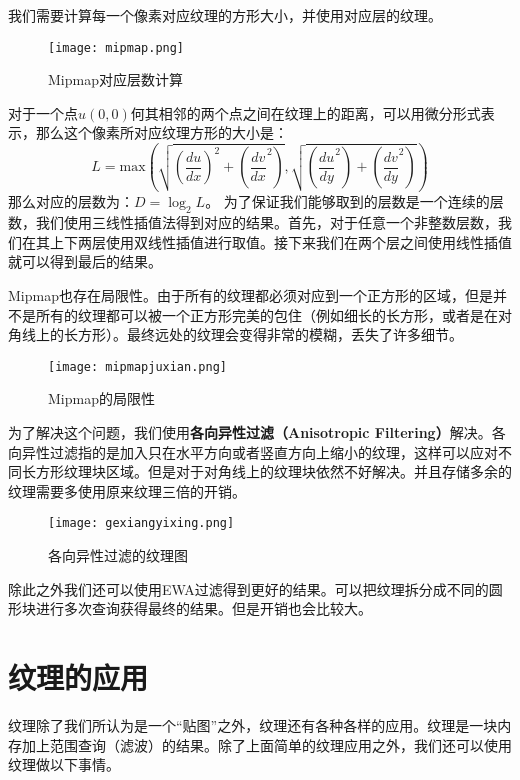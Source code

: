 \documentclass[openany]{progbookcn}
\begin{document}
我们需要计算每一个像素对应纹理的方形大小，并使用对应层的纹理。
\begin{figure}[H]
	\centering
	\texttt{[image: mipmap.png]}
	\caption{Mipmap对应层数计算}
	\label{fig:mipmap}
\end{figure}
对于一个点$u(0,0)$何其相邻的两个点之间在纹理上的距离，可以用微分形式表示，那么这个像素所对应纹理方形的大小是：
\begin{equation}
	L= \text{max}(\sqrt{(\frac{du}{dx})^2+(\frac{dv}{dx}^2)},\sqrt{(\frac{du}{dy}^2)+(\frac{dv}{dy}^2)})
\end{equation}
那么对应的层数为：$D=\log_2L$。
为了保证我们能够取到的层数是一个连续的层数，我们使用三线性插值法得到对应的结果。首先，对于任意一个非整数层数，我们在其上下两层使用双线性插值进行取值。接下来我们在两个层之间使用线性插值就可以得到最后的结果。

Mipmap也存在局限性。由于所有的纹理都必须对应到一个正方形的区域，但是并不是所有的纹理都可以被一个正方形完美的包住（例如细长的长方形，或者是在对角线上的长方形）。最终远处的纹理会变得非常的模糊，丢失了许多细节。
\begin{figure}[H]
	\centering
	\texttt{[image: mipmapjuxian.png]}
	\caption{Mipmap的局限性}
	\label{fig:mipmapjuxian}
\end{figure}
为了解决这个问题，我们使用\textbf{各向异性过滤（Anisotropic Filtering）}解决。各向异性过滤指的是加入只在水平方向或者竖直方向上缩小的纹理，这样可以应对不同长方形纹理块区域。但是对于对角线上的纹理块依然不好解决。并且存储多余的纹理需要多使用原来纹理三倍的开销。
\begin{figure}[H]
	\centering
	\texttt{[image: gexiangyixing.png]}
	\caption{各向异性过滤的纹理图}
	\label{fig:gexiangyixing}
\end{figure}
除此之外我们还可以使用EWA过滤得到更好的结果。可以把纹理拆分成不同的圆形块进行多次查询获得最终的结果。但是开销也会比较大。

\section{纹理的应用}
纹理除了我们所认为是一个“贴图”之外，纹理还有各种各样的应用。纹理是一块内存加上范围查询（滤波）的结果。除了上面简单的纹理应用之外，我们还可以使用纹理做以下事情。
\end{document}
